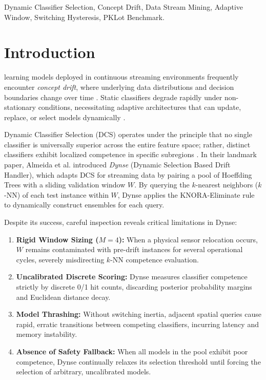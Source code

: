 \documentclass[conference,10pt]{IEEEtran}
\begin{document}
\begin{IEEEkeywords}
Dynamic Classifier Selection, Concept Drift, Data Stream Mining, Adaptive Window, Switching Hysteresis, PKLot Benchmark.
\end{IEEEkeywords}

\section{Introduction}
 learning models deployed in continuous streaming environments frequently encounter \textit{concept drift}, where underlying data distributions and decision boundaries change over time \cite{gama2014survey, ditzler2015learning}. Static classifiers degrade rapidly under non-stationary conditions, necessitating adaptive architectures that can update, replace, or select models dynamically \cite{brzezinski2014reacting}.

Dynamic Classifier Selection (DCS) operates under the principle that no single classifier is universally superior across the entire feature space; rather, distinct classifiers exhibit localized competence in specific subregions \cite{ko2008dynamic, cruz2018dynamic}. In their landmark paper, Almeida et al. \cite{almeida2018adapting} introduced \textit{Dynse} (Dynamic Selection Based Drift Handler), which adapts DCS for streaming data by pairing a pool of Hoeffding Trees \cite{domingos2000mining} with a sliding validation window $W$. By querying the $k$-nearest neighbors ($k$-NN) of each test instance within $W$, Dynse applies the KNORA-Eliminate rule \cite{ko2008dynamic} to dynamically construct ensembles for each query.

Despite its success, careful inspection reveals critical limitations in Dynse:
\begin{enumerate}
    \item \textbf{Rigid Window Sizing ($M = 4$):} When a physical sensor relocation occurs, $W$ remains contaminated with pre-drift instances for several operational cycles, severely misdirecting $k$-NN competence evaluation.
    \item \textbf{Uncalibrated Discrete Scoring:} Dynse measures classifier competence strictly by discrete 0/1 hit counts, discarding posterior probability margins and Euclidean distance decay.
    \item \textbf{Model Thrashing:} Without switching inertia, adjacent spatial queries cause rapid, erratic transitions between competing classifiers, incurring latency and memory instability.
    \item \textbf{Absence of Safety Fallback:} When all models in the pool exhibit poor competence, Dynse continually relaxes its selection threshold until forcing the selection of arbitrary, uncalibrated models.
\end{enumerate}
\end{document}
